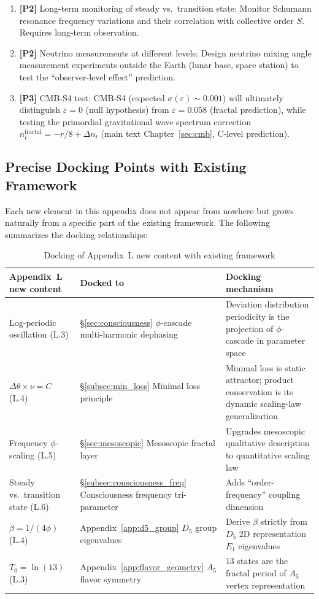 \begin{enumerate}
\item \textbf{[P2]} Long-term monitoring of steady vs.\ transition state: Monitor Schumann resonance frequency variations and their correlation with collective order $S$. Requires long-term observation.

\item \textbf{[P2]} Neutrino measurements at different levels: Design neutrino mixing angle measurement experiments outside the Earth (lunar base, space station) to test the ``observer-level effect'' prediction.

\item \textbf{[P3]} CMB-S4 test: CMB-S4 (expected $\sigma(\varepsilon) \sim 0.001$) will ultimately distinguish $\varepsilon = 0$ (null hypothesis) from $\varepsilon = 0.058$ (fractal prediction), while testing the primordial gravitational wave spectrum correction $n_t^{\text{fractal}} = -r/8 + \Delta n_t$ (main text Chapter~\ref{sec:cmb}, C-level prediction).
\end{enumerate}

\subsection{Precise Docking Points with Existing Framework}
\label{subsec:docking_points_en}

Each new element in this appendix does not appear from nowhere but grows naturally from a specific part of the existing framework. The following summarizes the docking relationships:

\begin{table}[htbp]
\centering
\caption{Docking of Appendix~L new content with existing framework}
\label{tab:docking_points_en}
\begin{tabular}{llp{6cm}}
\hline
Appendix~L new content & Docked to & Docking mechanism \\
\hline
Log-periodic oscillation (L.3) & \S\ref{sec:consciousness} $\phi$-cascade multi-harmonic dephasing & Deviation distribution periodicity is the projection of $\phi$-cascade in parameter space \\
$\Delta\theta \times \nu = C$ (L.4) & \S\ref{subsec:min_loss} Minimal loss principle & Minimal loss is static attractor; product conservation is its dynamic scaling-law generalization \\
Frequency $\phi$-scaling (L.5) & \S\ref{sec:mesoscopic} Mesoscopic fractal layer & Upgrades mesoscopic qualitative description to quantitative scaling law \\
Steady vs.\ transition state (L.6) & \S\ref{subsec:consciousness_freq} Consciousness frequency tri-parameter & Adds ``order-frequency'' coupling dimension \\
$\beta = 1/(4\phi)$ (L.4) & Appendix~\ref{app:d5_group} $D_5$ group eigenvalues & Derive $\beta$ strictly from $D_5$ 2D representation $E_1$ eigenvalues \\
$T_0 = \ln(13)$ (L.3) & Appendix~\ref{app:flavor_geometry} $A_5$ flavor symmetry & 13 states are the fractal period of $A_5$ vertex representation \\
\hline
\end{tabular}
\end{table}

